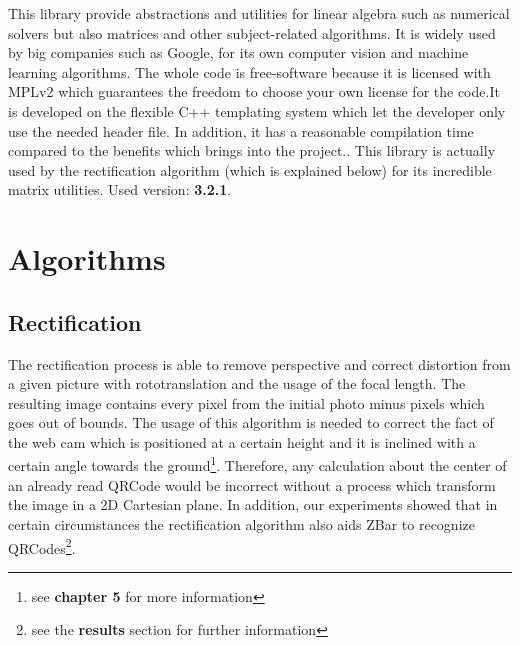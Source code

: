 This library provide abstractions and utilities for linear algebra such as numerical solvers but also matrices and other subject-related algorithms.
It is widely used by big companies such as Google, for its own computer vision and machine learning algorithms.
The whole code is free-software because it is licensed with MPLv2 which guarantees the freedom to choose your own license for the code.It is developed on the flexible C++ templating system which let the developer only use the needed header file. In addition, it has a reasonable compilation time compared to the benefits which brings into the project.\cite{eigeninfo}.
This library is actually used by the rectification algorithm (which is explained below) for its incredible matrix utilities.
\newline Used version: \textbf{3.2.1}.

\section{Algorithms}

\subsection{Rectification}
The rectification process is able to remove perspective and correct distortion from a given picture with rototranslation and the usage of the focal length. The resulting image contains every pixel from the initial photo minus pixels which goes out of bounds. The usage of this algorithm is needed to correct the fact of the web cam which is positioned at a certain height and it is inclined with a certain angle towards the ground\footnote{see \textbf{chapter 5} for more information}. Therefore, any calculation about the center of an already read QRCode would be incorrect without a process which transform the image in a 2D Cartesian plane. In addition, our experiments showed that in certain circumstances the rectification algorithm also aids ZBar to recognize QRCodes\footnote{see the \textbf{results} section for further information}. 








 
